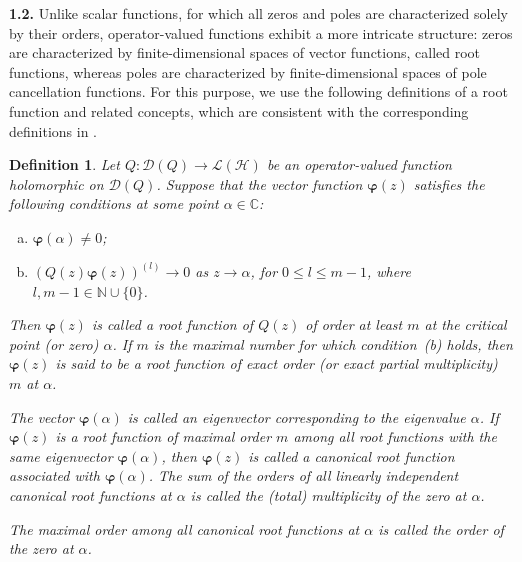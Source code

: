 \documentclass[11pt, reqno]{amsart}
\theoremstyle{plain}
\newtheorem{defi}{Definition}[section]
\theoremstyle{remark}
\newcounter{str}
\numberwithin{equation}{section}
\begin{document}
\textbf{1.2.} Unlike scalar functions, for which all zeros and poles are characterized solely by their orders, operator-valued functions exhibit a more intricate structure: zeros are characterized by finite-dimensional spaces of vector functions, called root functions, whereas poles are characterized by finite-dimensional spaces of pole cancellation functions. For this purpose, we use the following definitions of a root function and related concepts, which are consistent with the corresponding definitions in \cite{GS, B1, BLu, GT}.

\begin{defi}\label{definition22}
Let $Q : \mathcal{D}(Q) \rightarrow \mathcal{L}(\mathcal{H})$ be an operator-valued function holomorphic on $\mathcal{D}(Q)$. Suppose that the vector function $\boldsymbol{\varphi}(z)$ satisfies the following conditions at some point $\alpha \in \mathbb{C}$:
\begin{enumerate}[(a)]
\item $\boldsymbol{\varphi}(\alpha) \ne 0$;
\item $(Q(z)\boldsymbol{\varphi}(z))^{(l)} \to 0$ as $z \to \alpha$, for $0 \le l \le m-1$, where $l, m-1 \in \mathbb{N} \cup \{0\}$.
\end{enumerate}
Then $\boldsymbol{\varphi}(z)$ is called a \textit{root function} of $Q(z)$ of order at least $m$ at the critical point (or zero) $\alpha$. If $m$ is the maximal number for which condition~(b) holds, then $\boldsymbol{\varphi}(z)$ is said to be a root function of \textit{exact order} (or \textit{exact partial multiplicity}) $m$ at $\alpha$.

The vector $\boldsymbol{\varphi}(\alpha)$ is called an \textit{eigenvector corresponding to the eigenvalue} $\alpha$. If $\boldsymbol{\varphi}(z)$ is a root function of maximal order $m$ among all root functions with the same eigenvector $\boldsymbol{\varphi}(\alpha)$, then $\boldsymbol{\varphi}(z)$ is called a \textit{canonical root function} associated with $\boldsymbol{\varphi}(\alpha)$. The sum of the orders of all linearly independent canonical root functions at $\alpha$ is called the (total) multiplicity of the zero at $\alpha$.

The maximal order among all canonical root functions at $\alpha$ is called the \textit{order of the zero} at $\alpha$.
\end{defi}
\end{document}
